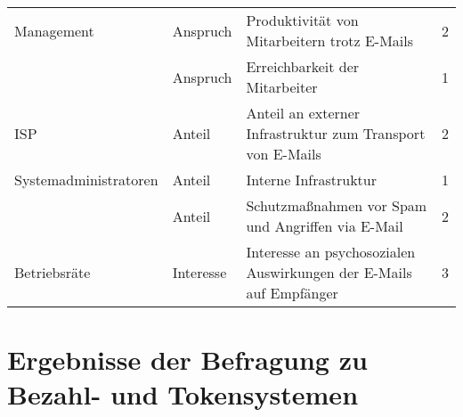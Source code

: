 \begin{table}[H]
\begin{tabular}{|l|l|l|l|}
    Management            & Anspruch           & Produktivität von Mitarbeitern trotz E-Mails                       & 2                  \\ \cline{2-4} 
                                           & Anspruch           & Erreichbarkeit der Mitarbeiter                                     & 1                  \\ \hline
    ISP                                    & Anteil             & Anteil an externer Infrastruktur zum Transport von E-Mails         & 2                  \\ \hline
    Systemadministratoren & Anteil             & Interne Infrastruktur                                              & 1                  \\ \cline{2-4} 
                                           & Anteil             & Schutzmaßnahmen vor Spam und Angriffen via E-Mail                  & 2                  \\ \hline
    Betriebsräte                           & Interesse          & Interesse an psychosozialen Auswirkungen der E-Mails auf Empfänger & 3                  \\ \hline
    \end{tabular}
	\label{tab:stakeholderanalyse}
\end{table}


\section{Ergebnisse der Befragung zu Bezahl- und Tokensystemen}

